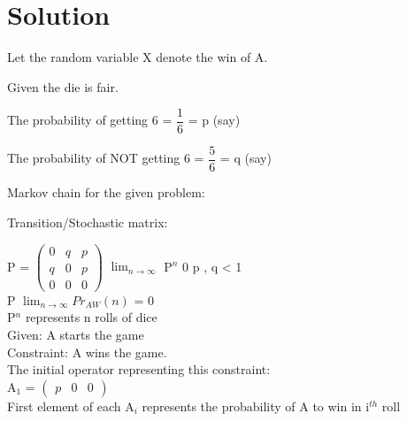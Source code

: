 \documentclass[journal,12pt,twocolumn]{IEEEtran}
\theoremstyle{remark}
\newcommand{\myvec}[1]{\ensuremath{\begin{pmatrix}#1\end{pmatrix}}}
\numberwithin{equation}{subsection}
\begin{document}
\section{\Large Solution}
\begin{description}
    \item Let the random variable X denote the win of A.
    \item Given the die is fair.
    \item The probability of getting 6 = $\dfrac{1}{6}$ = p (say)
    \item The probability of NOT getting 6 = $\dfrac{5}{6}$ = q (say)
    \item Markov chain for the given problem:
\end{description}
\begin{center}
\end{center}
Transition/Stochastic matrix:\\
\begin{definition}
    P = \myvec{
    0 & q & p\\
    q & 0 & p\\
    0 & 0 & 0}
    \implies $\lim_{n \to \infty}$ P$^n$ \xrightarrow{} 0 \because p , q < 1\\
    \implies P 
    \implies $\lim_{n \to \infty}$$Pr_{AW}(n)$ = 0\\
    P$^n$ represents n rolls of dice\\
    Given: A starts the game\\
    Constraint: A wins the game.\\
    The initial operator representing this constraint:\\
    A$_1$ = \myvec{p & 0 & 0}\\
    First element of each A$_i$ represents the probability of A to win in i$^{th}$ roll
    
\end{definition}
\end{document}
